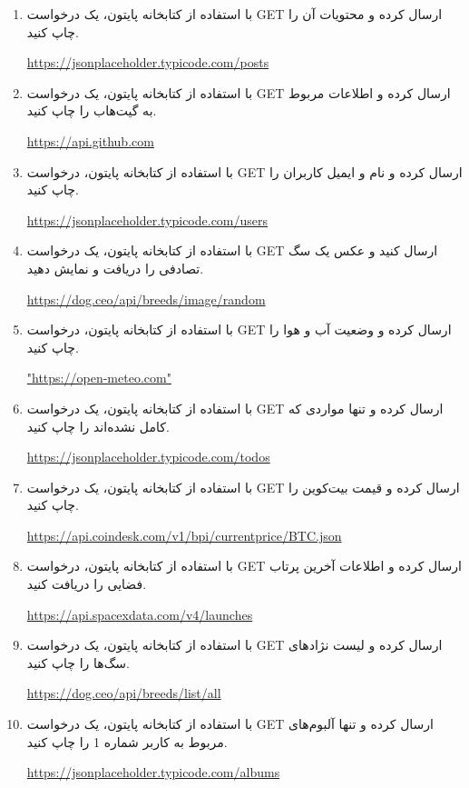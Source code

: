 \documentclass[b5paper,12pt]{article}
\begin{document}
	\begin{enumerate}
		\item با استفاده از کتابخانه  پایتون، یک درخواست GET ارسال کرده و محتویات آن را چاپ کنید.
		\begin{flushleft}
			\url{https://jsonplaceholder.typicode.com/posts}
		\end{flushleft}
		\item با استفاده از کتابخانه  پایتون، یک درخواست GET ارسال کرده و اطلاعات مربوط به گیت‌هاب را چاپ کنید.
		\begin{flushleft}
			\url{https://api.github.com}
		\end{flushleft}
		\item با استفاده از کتابخانه  پایتون، درخواست GET ارسال کرده و نام و ایمیل کاربران را چاپ کنید.
		\begin{flushleft}
			\url{https://jsonplaceholder.typicode.com/users}
		\end{flushleft}
		\item با استفاده از کتابخانه  پایتون، یک درخواست GET ارسال کنید و عکس یک سگ تصادفی را دریافت و نمایش دهید.
		\begin{flushleft}
			\url{https://dog.ceo/api/breeds/image/random}
		\end{flushleft}
		\item با استفاده از کتابخانه  پایتون، درخواست GET ارسال کرده و وضعیت آب و هوا را چاپ کنید.
		\begin{flushleft}
			\url{"https://open-meteo.com"}
		\end{flushleft}
		\item با استفاده از کتابخانه  پایتون، یک درخواست GET ارسال کرده و تنها مواردی که کامل نشده‌اند را چاپ کنید.
		\begin{flushleft}
			\url{https://jsonplaceholder.typicode.com/todos}
		\end{flushleft}
		\item با استفاده از کتابخانه  پایتون، یک درخواست GET ارسال کرده و قیمت بیت‌کوین را چاپ کنید.
		\begin{flushleft}
			\url{https://api.coindesk.com/v1/bpi/currentprice/BTC.json}
		\end{flushleft}
		\item با استفاده از کتابخانه  پایتون، درخواست GET ارسال کرده و اطلاعات آخرین پرتاب فضایی را دریافت کنید.
		\begin{flushleft}
			\url{https://api.spacexdata.com/v4/launches}
		\end{flushleft}
		\item با استفاده از کتابخانه  پایتون، یک درخواست GET ارسال کرده و لیست نژادهای سگ‌ها را چاپ کنید.
		\begin{flushleft}
			\url{https://dog.ceo/api/breeds/list/all}
		\end{flushleft}
		\item با استفاده از کتابخانه  پایتون، یک درخواست GET ارسال کرده و تنها آلبوم‌های مربوط به کاربر شماره 1 را چاپ کنید.
		\begin{flushleft}
			\url{https://jsonplaceholder.typicode.com/albums}
		\end{flushleft}
	\end{enumerate}
	
\end{document}
